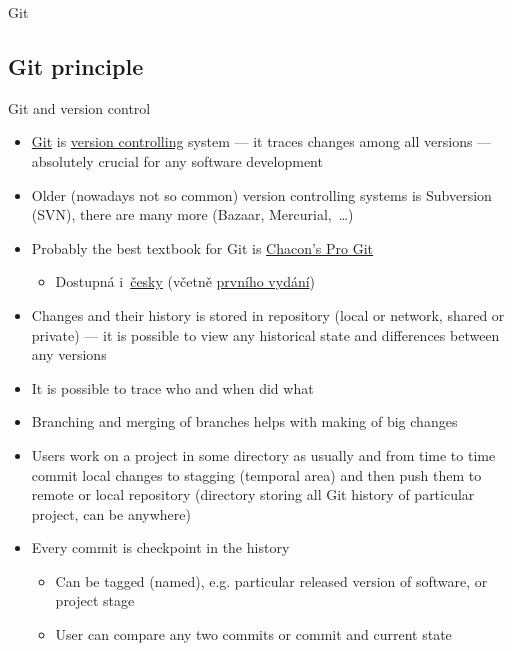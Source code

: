 \documentclass[compress, ucs, xelatex, 11pt, xcolor=svgnames, aspectratio=169,
	hyperref={
		bookmarks=true,
		unicode=true,
		colorlinks=true,
		pdftitle={Linux, command line and MetaCentrum},
		plainpages=false,
		pdfauthor={Vojtech Zeisek},
		pdfsubject={Course about use of Linux command line, writing shell scripts and using MetaCentrum of CESNET},
		pdfcreator={XeLaTeX},
		pdfkeywords={Linux, GNU, BASH, shell, command line, MetaCentrum},
		linkcolor=DarkRed, %
		anchorcolor=DarkBlue, %
		citecolor=Indigo, %
		filecolor=NavyBlue, %
		menucolor=DarkMagenta, %
		urlcolor=DarkBlue, %
		pdftex},
	url={hyphens, lowtilde} %
	]{beamer}
\begin{document}
\begin{frame}{Git}
	\tableofcontents[currentsection, sectionstyle=show/hide, hideothersubsections]
\end{frame}

\subsection{Git principle}

\begin{frame}[allowframebreaks]{Git and version control}
	\begin{itemize}
		\item \href{https://git-scm.com/}{Git} is \href{https://en.wikipedia.org/wiki/Version_control}{version controlling} system --- it traces changes among all versions --- absolutely crucial for any software development
		\item Older (nowadays not so common) version controlling systems is Subversion (SVN), there are many more (Bazaar, Mercurial,~\ldots)
		\item Probably the best textbook for Git is \href{https://git-scm.com/book/en/v2}{Chacon's Pro Git}
		\begin{itemize}
			\item Dostupná i~\href{https://git-scm.com/book/cs/v2}{česky} (včetně \href{https://knihy.nic.cz/}{prvního vydání})
		\end{itemize}
		\item Changes and their history is stored in repository (local or network, shared or private) --- it is possible to view any historical state and differences between any versions
		\item It is possible to trace who and when did what
		\item Branching and merging of branches helps with making of big changes
		\item Users work on a project in some directory as usually and from time to time commit local changes to stagging (temporal area) and then push them to remote or local repository (directory storing all Git history of particular project, can be anywhere)
		\item Every commit is checkpoint in the history
		\begin{itemize}
			\item Can be tagged (named), e.g. particular released version of software, or project stage
			\item User can compare any two commits or commit and current state
		\end{itemize}

\end{itemize}
\end{frame}
\end{document}
